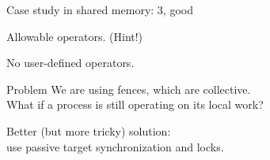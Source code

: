 \begin{mpithree}

\begin{numberedframe}{Case study in shared memory: 3, good}
  \label{sl:fetchacc}
\end{numberedframe}

\begin{numberedframe}{Allowable operators. (Hint!)}
  

  No user-defined operators.
\end{numberedframe}

\begin{numberedframe}{Problem}
  We are using fences, which are collective.\\
  What if a process is still operating on its local work?

  Better (but more tricky) solution:\\
  use passive target synchronization and locks.
\end{numberedframe}

\begin{exerciseframe}[lockfetch]
  
\end{exerciseframe}

\begin{exerciseframe}[lockfetchshared]
  
\end{exerciseframe}

\end{mpithree}

\endinput

\begin{numberedframe}{}
  \label{sl:}
\end{numberedframe}

\begin{optexerciseframe}
  
\end{optexerciseframe}

